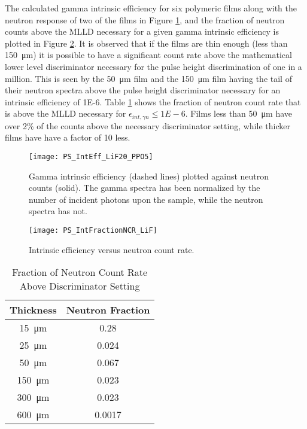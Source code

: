 The calculated gamma intrinsic efficiency for six polymeric films along with the neutron response of two of the films in Figure \ref{fig:GammaIntrNeutronCounts}, and the fraction of neutron counts above the MLLD necessary for a given gamma intrinsic efficiency is plotted in Figure \ref{fig:crVsIntEff}.
It is observed that if the films are thin enough (less than \SI{150}{\um}) it is possible to have a significant count rate above the mathematical lower level discriminator necessary for the pulse height discrimination of one in a million.
This is seen by the \SI{50}{\um} film and the \SI{150}{\um} film having the tail of their neutron spectra above the pulse height discriminator necessary for an intrinsic efficiency of \num{1E-6}.
Table \ref{tab:FractionCRGamma} shows the fraction of neutron count rate that is above the MLLD necessary for $\epsilon_{int,\gamma n} \le \si{1E-6}$.
Films less than \SI{50}{\um} have over 2\% of the counts above the necessary discriminator setting, while thicker films have have a factor of 10 less.
\begin{figure}[ht]
    \centering
    \texttt{[image: PS\_IntEff\_LiF20\_PPO5]}
    \caption[PS Gamma intrinsic efficiency and neutron count rate]{Gamma intrinsic efficiency (dashed lines) plotted against neutron counts (solid). The gamma spectra has been normalized by the number of incident photons upon the sample, while the neutron spectra has not.}
    \label{fig:GammaIntrNeutronCounts}
\end{figure}
\begin{figure}[ht]
    \centering
    \texttt{[image: PS\_IntFractionNCR\_LiF]}
    \caption{Intrinsic efficiency versus neutron count rate. }
    \label{fig:crVsIntEff}
\end{figure}
\begin{table}[]
    \caption{Fraction of Neutron Count Rate Above Discriminator Setting}
	\centering
	\begin{tabular}{c | c}
	Thickness & Neutron Fraction \\
	\hline
	\hline
	\SI{15}{\um} & 0.28 \\
	\SI{25}{\um} & 0.024 \\
	\SI{50}{\um}  & 0.067 \\
	\SI{150}{\um}  & 0.023 \\
	\SI{300}{\um}  & 0.023 \\
	\SI{600}{\um}  & 0.0017 \\
	\end{tabular}
  \label{tab:FractionCRGamma}
\end{table}
